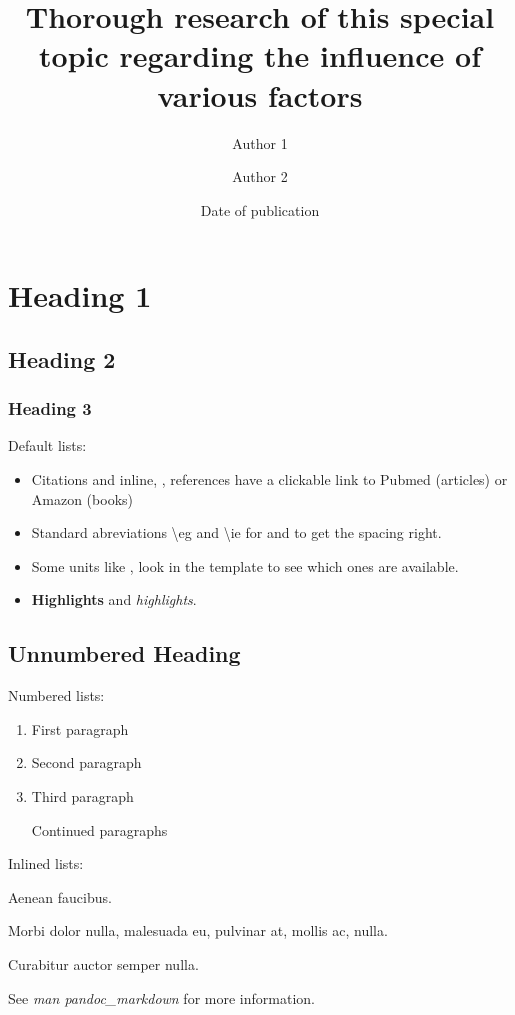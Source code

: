 \documentclass[pagesize,english,DIV=calc,footinclude=false
    ,DIV=12,parskip=half,fontsize=12pt
]{scrartcl}
\title{Thorough research of this special topic regarding the influence of
various factors}
\author{Author 1 \and Author 2}
\date{Date of publication}
\begin{document}
\maketitle


{
\hypersetup{linkcolor=black}
\setcounter{tocdepth}{2}
\tableofcontents
}

\section{Heading 1}\label{heading-1}

\subsection{Heading 2}\label{heading-2}

\subsubsection{Heading 3}\label{heading-3}

Default lists:

\begin{itemize}
\itemsep1pt\parskip0pt
\item
  Citations \autocite{Macherey2006} and inline,
  \eg \textcite{Macherey2006}, references have a clickable link to
  Pubmed (articles) or Amazon (books)
\item
  Standard abreviations \textbackslash{}eg and \textbackslash{}ie for
  \eg and \ie to get the spacing right.
\item
  Some units like , look in the template to see which ones are
  available.
\item
  \textbf{Highlights} and \emph{highlights}.
\end{itemize}

\subsection*{Unnumbered Heading}\label{unnumbered-heading}

Numbered lists:

\begin{enumerate}
\def\labelenumi{\arabic{enumi}.}
\item
  First paragraph
\item
  Second paragraph
\item
  Third paragraph

  Continued paragraphs
\end{enumerate}

Inlined lists: \begin{inparaenum}[(1)] \item Aenean
faucibus. \item Morbi dolor nulla, malesuada eu, pulvinar at, mollis ac,
nulla. \item Curabitur auctor semper nulla. \end{inparaenum}

See \emph{man pandoc\_markdown} for more information.

\printbibliography
\end{document}
